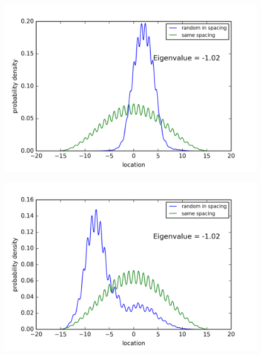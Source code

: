 \begin{figure}[!htbh]
\centering
\begin{minipage}{.45\textwidth}
  \centering
  \includegraphics[width=1.1\linewidth]{Graphics/1_0_1th_Lowest_Rand0_8.png}
  \label{fig:Area1_1thlowestRand0.8}
\end{minipage}\qquad
\begin{minipage}{.45\textwidth}
  \centering
  \includegraphics[width=1.1\linewidth]{Graphics/1_0_1th_Lowest_Rand0_9.png}
  \label{fig:Area1_1thlowestRand0.9}
\end{minipage}
\end{figure}


